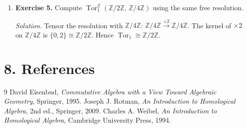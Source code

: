 \begin{enumerate}[leftmargin=*,itemsep=0.9em]
\item \textbf{Exercise 5.} Compute $\operatorname{Tor}_1^{\mathbb{Z}}(\mathbb{Z}/2\mathbb{Z},\,\mathbb{Z}/4\mathbb{Z})$ using the same free resolution.

\emph{Solution.} Tensor the resolution with $\mathbb{Z}/4\mathbb{Z}$: $\mathbb{Z}/4\mathbb{Z}\xrightarrow{\times 2}\mathbb{Z}/4\mathbb{Z}$. The kernel of $\times 2$ on $\mathbb{Z}/4\mathbb{Z}$ is $\{0,2\}\cong\mathbb{Z}/2\mathbb{Z}$. Hence $\operatorname{Tor}_1\cong\mathbb{Z}/2\mathbb{Z}$.

\end{enumerate}
\section*{8. References}

\begin{thebibliography}{9}
 David Eisenbud, \emph{Commutative Algebra with a View Toward Algebraic Geometry}, Springer, 1995.
 Joseph J. Rotman, \emph{An Introduction to Homological Algebra}, 2nd ed., Springer, 2009.
 Charles A. Weibel, \emph{An Introduction to Homological Algebra}, Cambridge University Press, 1994.
\end{thebibliography}